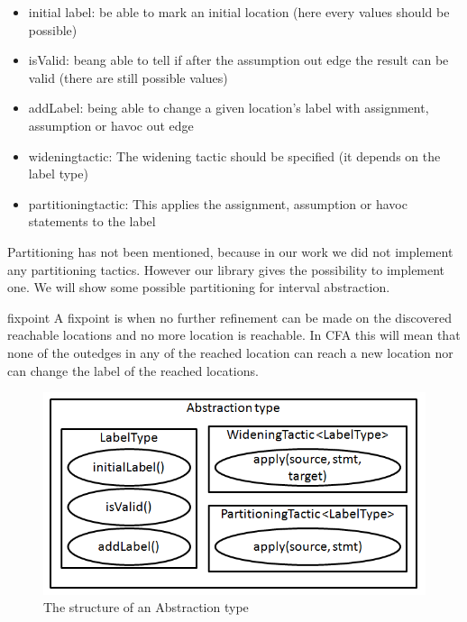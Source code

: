 \begin{itemize}
	\item initial label: be able to mark an initial location (here every values should be possible)
	\item isValid: beang able to tell if after the assumption out edge the result can be valid (there are still possible values)
	\item addLabel: being able to change a given location's label with assignment, assumption or havoc out edge
	\item wideningtactic: The widening tactic should be specified (it depends on the label type)
	\item partitioningtactic: This applies the assignment, assumption or havoc statements to the label
\end{itemize}

Partitioning has not been mentioned, because in our work we did not implement any partitioning tactics. However our library gives the possibility to implement one. We will show some possible partitioning for interval abstraction.

\begin{definition}{fixpoint}
	\label{def:fixpoint}
	A fixpoint is when no further refinement can be made on the discovered reachable locations and no more location is reachable.
	In CFA this will mean that none of the outedges in any of the reached location can reach a new location nor can change the label of the reached locations.
\end{definition}

\begin{figure} [!ht]
	\centering
	\includegraphics[width=150mm, keepaspectratio]{figures/abstractiontype.png}
	\caption{\label{fig:abstype} The structure of an Abstraction type}
\end{figure}








